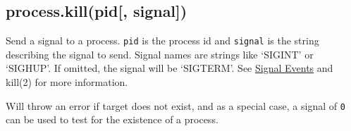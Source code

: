 \begin{Shaded}
\begin{Highlighting}[]
\NormalTok{\{ }\NormalTok{:}
   \NormalTok{\{ }\NormalTok{: [],}
     \NormalTok{: }\NormalTok{,}
     \NormalTok{: [],}
     \NormalTok{: [],}
     \NormalTok{: [] \},}
  \NormalTok{:}
   \NormalTok{\{ }\NormalTok{: }\NormalTok{,}
     \NormalTok{: }\NormalTok{,}
     \NormalTok{: }\NormalTok{,}
     \NormalTok{: }\NormalTok{,}
     \NormalTok{: }\NormalTok{,}
     \NormalTok{: }\NormalTok{,}
     \NormalTok{: }\NormalTok{,}
     \NormalTok{: }\NormalTok{,}
     \NormalTok{: }\NormalTok{,}
     \NormalTok{: }\NormalTok{,}
     \NormalTok{: }\NormalTok{,}
     \NormalTok{: }\NormalTok{,}
     \NormalTok{: }\NormalTok{,}
     \NormalTok{: } \NormalTok{\} \}}
\end{Highlighting}
\end{Shaded}

\subsection{process.kill(pid{[},
signal{]})}\label{process.killpid-signal}

Send a signal to a process. \texttt{pid} is the process id and
\texttt{signal} is the string describing the signal to send. Signal
names are strings like `SIGINT' or `SIGHUP'. If omitted, the signal will
be `SIGTERM'. See \hyperref[processux5fsignalux5fevents]{Signal Events}
and kill(2) for more information.

Will throw an error if target does not exist, and as a special case, a
signal of \texttt{0} can be used to test for the existence of a process.

